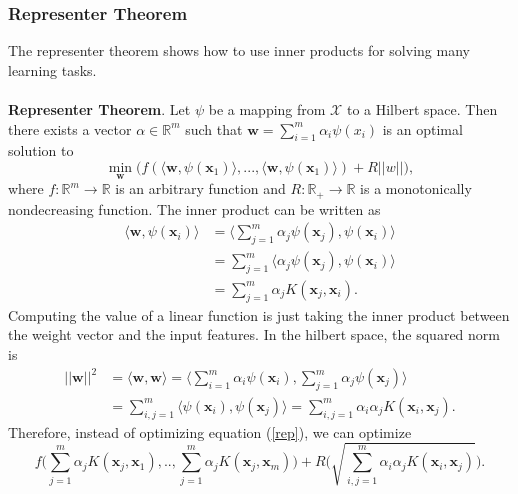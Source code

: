 \documentclass{article}
\begin{document}
	\subsubsection{Representer Theorem}
    The representer theorem shows how to use inner products for solving many learning tasks.
    \\\\
    \textbf{Representer Theorem}. Let $\psi$ be a mapping from $\mathcal{X}$ to a Hilbert space. Then there exists a vector $\alpha \in \mathbb{R}^m$ such that $\mathbf{w} = \sum_{i=1}^m \alpha_i \psi(x_i)$ is an optimal solution to
    \begin{equation}
    \min_{\mathbf{w}} \Big( f(\langle \mathbf{w}, \psi(\mathbf{x}_1) \rangle,...,\langle \mathbf{w}, \psi(\mathbf{x}_1) \rangle ) + R||w|| \Big),
    \label{rep}
    \end{equation}
    where $f:\mathbb{R}^m \rightarrow \mathbb{R}$ is an arbitrary function and $R:\mathbb{R}_+ \rightarrow \mathbb{R}$ is a monotonically nondecreasing function. The inner product can be written as
    \begin{align}
    \langle \mathbf{w}, \psi(\mathbf{x}_i) \rangle &= \Bigg\langle \sum_{j=1}^m \alpha_j \psi(\mathbf{x}_j), \psi(\mathbf{x}_i) \Bigg\rangle \\
    &= \sum_{j=1}^m \langle \alpha_j \psi(\mathbf{x}_j), \psi(\mathbf{x}_i) \rangle \\
    &= \sum_{j=1}^m \alpha_j K(\mathbf{x}_j, \mathbf{x}_i).
    \end{align}
    Computing the value of a linear function is just taking the inner product between the weight vector and the input features. In the hilbert space, the squared norm is 
    \begin{align}
    ||\mathbf{w}||^2 &= \langle \mathbf{w},\mathbf{w} \rangle = \Bigg\langle \sum_{i=1}^m \alpha_i \psi(\mathbf{x}_i), \sum_{j=1}^m \alpha_j \psi(\mathbf{x}_j) \Bigg\rangle \\
    &= \sum_{i, j=1}^m \langle \psi(\mathbf{x}_i), \psi(\mathbf{x}_j) \rangle = \sum_{i,j=1}^m \alpha_i \alpha_j K(\mathbf{x}_i, \mathbf{x}_j).
    \end{align}
    Therefore, instead of optimizing equation (\ref{rep}), we can optimize
    \begin{equation}
    f\Bigg( \sum_{j=1}^m \alpha_j K(\mathbf{x}_j, \mathbf{x}_1),.., \sum_{j=1}^m \alpha_j K(\mathbf{x}_j, \mathbf{x}_m) \Bigg) + R \Bigg( \sqrt{\sum_{i,j=1}^m \alpha_i \alpha_j K(\mathbf{x}_i, \mathbf{x}_j)} \Bigg).
    \end{equation}
\end{document}

